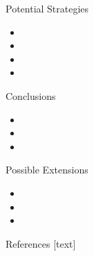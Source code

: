 \documentclass[final]{beamer}\usepackage[]{graphicx}\usepackage[]{color}
\newlength{\onecolwid}
\begin{document}
\begin{frame}[t]
\begin{columns}[t]
\begin{column}{\onecolwid}
\begin{block}{Potential Strategies}
\vspace{0ex}
\begin{itemize}
\item
\item
\item
\item
\end{itemize}
\vspace{0ex}
\vfill
\end{block}
\vfill


\begin{block}{Conclusions}
\begin{itemize}
\item
\item
\item
\end{itemize}
\vspace{0ex}
\vfill
\end{block}
\vfill
\begin{block}{Possible Extensions}
\begin{itemize}
\item  
\item  
\item  
\end{itemize}
\vspace{0ex}
\vfill
\end{block}
\vfill

\begin{block}{References}
\footnotesize
{}[text]
\vspace{-1ex}



\normalsize
\vfill
\end{block} 
\vfill




\end{column}
\end{columns}
\end{frame}
\end{document}
